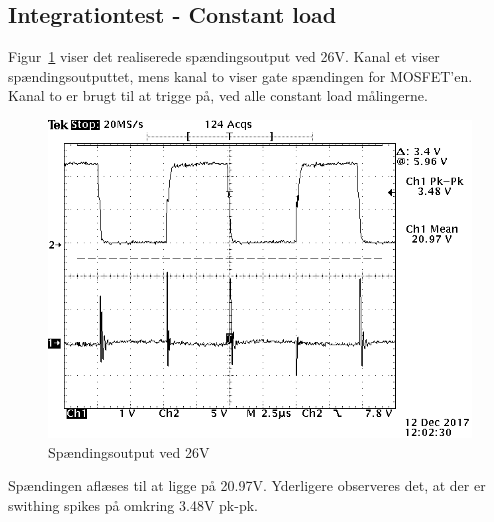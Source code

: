 \subsection{Integrationtest - Constant load}
Figur~\ref{fig: Out26V} viser det realiserede spændingsoutput ved 26V. Kanal et viser spændingsoutputtet, mens kanal to viser gate spændingen for MOSFET'en. Kanal to er brugt til at trigge på, ved alle constant load målingerne. 
\begin{figure}[H]
	\center
	\includegraphics[max width=0.7\linewidth]{../dokumentation/tex/2iteration/billeder/Realisering/udgang_f_filter_2iteration.png}
	\caption{Spændingsoutput ved 26V}
	\label{fig: Out26V}
\end{figure}
Spændingen aflæses til at ligge på 20.97V. Yderligere observeres det, at der er swithing spikes på omkring 3.48V pk-pk.

